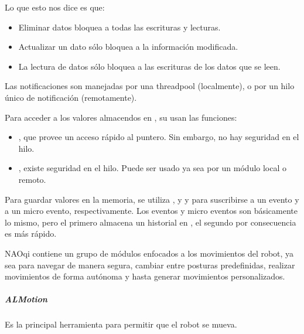 Lo que esto nos dice es que:
\begin{itemize}
\item {} 
Eliminar datos bloquea a todas las escrituras y lecturas.

\item {} 
Actualizar un dato sólo bloquea a la información modificada.

\item {} 
La lectura de datos sólo bloquea a las escrituras de los datos que se leen.

\end{itemize}

Las notificaciones son manejadas por una threadpool (localmente), o por un
hilo único de notificación (remotamente).


Para acceder a los valores almacendos en , su usan las funciones:
\begin{itemize}
\item {} 
, que provee un acceso rápido al puntero. Sin embargo, no hay seguridad en el hilo.

\item {} 
, existe seguridad en el hilo. Puede ser usado ya sea por un módulo local o remoto.

\end{itemize}

Para guardar valores en la memoria, se utiliza , y
 y 
para suscribirse a un evento y a un micro evento, respectivamente. Los eventos
y micro eventos son básicamente lo mismo, pero el primero almacena un historial
en , el segundo por consecuencia es más rápido.

NAOqi contiene un grupo de módulos enfocados a los movimientos del robot,
ya sea para navegar de manera segura, cambiar entre posturas predefinidas,
realizar movimientos de forma autónoma y hasta generar movimientos
personalizados.


\subparagraph{ALMotion}
\label{\detokenize{chapter_one/naoqi:almotion}}
Es la principal herramienta para permitir que el robot se mueva.

